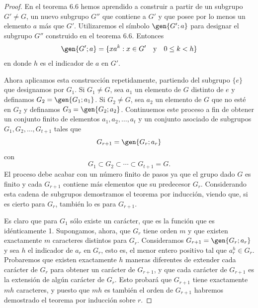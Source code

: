 \documentclass[12pt,a4paper]{book}
\begin{document}
    \begin{proof}
        En el teorema 6.6 hemos aprendido a construir a partir de un subgrupo $G'\neq G$,
        un nuevo subgrupo $G''$ que contiene a $G'$ y que posee por lo menos un elemento
        $a$ más que $G'$. Utilizaremos el símbolo $\gen{G';a}$ para designar el subgrupo
        $G''$ construido en el teorema 6.6. Entonces
        \begin{equation*}
            \gen{G';a}=\{xa^{k}:x\in G'\quad\text{y}\quad0\leq k<h\}
        \end{equation*}
        en donde $h$ es el indicador de $a$ en $G'$.

        Ahora aplicamos esta construcción repetidamente, partiendo del subgrupo $\{e\}$ que
        designamos por $G_{1}$. Si $G_{1}\neq G$, sea $a_{1}$ un elemento de $G$ distinto de $e$
        y definamos $G_{2}=\gen{G_{1};a_{1}}$. Si $G_{2}\neq G$, sea $a_{2}$ un elemento de $G$ que
        no esté en $G_{2}$ y definamos $G_{3}=\gen{G_{2};a_{2}}$. Continuemos este proceso a fin de
        obtener un conjunto finito de elementos $a_{1},a_{2},\dots,a_{t}$ y un conjunto asociado
        de subgrupos $G_{1},G_{2},\dots,G_{t+1}$ tales que
        \begin{equation*}
            G_{r+1}=\gen{G_{r};a_{r}}
        \end{equation*}
        con
        \begin{equation*}
            G_{1}\subset G_{2}\subset\cdots\subset G_{t+1}=G.
        \end{equation*}
        El proceso debe acabar con un número finito de pasos ya que el grupo dado $G$ es
        finito y cada $G_{r+1}$ contiene más elementos que su predecesor $G_{r}$.
        Considerando esta cadena de subgrupos demostramos el teorema por inducción,
        viendo que, si es cierto para $G_{r}$, también lo es para $G_{r+1}$.

        Es claro que para $G_{1}$ sólo existe un carácter, que es la función que es
        idénticamente 1. Supongamos, ahora, que $G_{r}$ tiene orden $m$ y que existen
        exactamente $m$ caracteres distintos para $G_{r}$. Consideramos
        $G_{r+1}=\gen{G_{r};a_{r}}$ y sea $h$ el indicador de $a_{r}$ en $G_{r}$, esto es, el menor
        entero positivo tal que $a_{r}^{h}\in G_{r}$. Probaremos que existen exactamente $h$
        maneras diferentes de extender cada carácter de $G_{r}$ para obtener un carácter de
        $G_{r+1}$, y que cada carácter de $G_{r+1}$ es la extensión de algún carácter de
        $G_{r}$. Esto probará que $G_{r+1}$ tiene exactamente $mh$ caracteres, y puesto que
        $mh$ es también el orden de $G_{r+1}$ habremos demostrado el teorema por inducción
        sobre $r$.


\end{proof}
\end{document}
